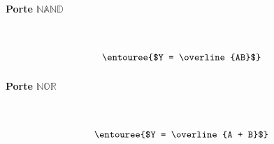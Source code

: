 \documentclass{report}
\begin{document}
\begin{multicols*}{3}
    \paragraph{Porte $\mathbb{NAND}$}
    \mbox{}\vspace{1em}\\
    \begin{minipage}{\columnwidth}
        \begin{minipage}[b]{0.5\columnwidth}
            \centering
            \nandgate
        \end{minipage}%
        \begin{minipage}[b]{0.5\columnwidth}
            \centering
        \end{minipage}
    \end{minipage}
    \[\entouree{$Y = \overline{AB}$} \]


    \paragraph{Porte $\mathbb{NOR}$}
    \mbox{}\vspace{1em}\\
    \begin{minipage}{\columnwidth}
        \begin{minipage}[b]{0.5\columnwidth}
            \centering
            \norgate
        \end{minipage}%
        \begin{minipage}[b]{0.5\columnwidth}
            \centering
        \end{minipage}
    \end{minipage}
    \[\entouree{$Y = \overline{A + B}$} \]




\end{multicols*}
\end{document}
